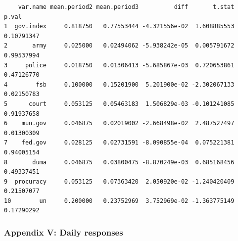 \documentclass[
  letterpaper,
  DIV=11,
  numbers=noendperiod]{scrartcl}
\begin{document}
\begin{verbatim}
    var.name mean.period2 mean.period3          diff       t.stat      p.val
1  gov.index     0.818750   0.77553444 -4.321556e-02  1.608885553 0.10791347
2       army     0.025000   0.02494062 -5.938242e-05  0.005791672 0.99537994
3     police     0.018750   0.01306413 -5.685867e-03  0.720653861 0.47126770
4        fsb     0.100000   0.15201900  5.201900e-02 -2.302067133 0.02150783
5      court     0.053125   0.05463183  1.506829e-03 -0.101241085 0.91937658
6    mun.gov     0.046875   0.02019002 -2.668498e-02  2.487527497 0.01300309
7    fed.gov     0.028125   0.02731591 -8.090855e-04  0.075221381 0.94005154
8       duma     0.046875   0.03800475 -8.870249e-03  0.685168456 0.49337451
9  procuracy     0.053125   0.07363420  2.050920e-02 -1.240420409 0.21507077
10        un     0.200000   0.23752969  3.752969e-02 -1.363775149 0.17290292
\end{verbatim}

\subsubsection{Appendix V: Daily
responses}\label{appendix-v-daily-responses}
\end{document}
